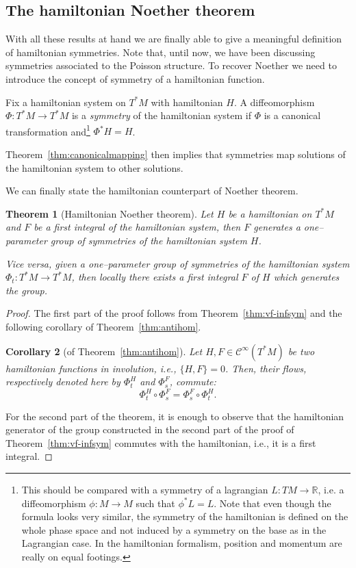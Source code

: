 \documentclass[english,fontsize=11pt,paper=a5,oneside]{scrbook}
\newcommand{\cC}{\mathcal{C}}
\newcommand{\R}{\mathbb{R}}
\newtheorem{theorem}{Theorem}[chapter]
\newtheorem{corollary}[theorem]{Corollary}
\theoremstyle{definition}
\begin{document}
\subsection{The hamiltonian Noether theorem}

With all these results at hand we are finally able to give a meaningful definition of hamiltonian symmetries.
Note that, until now, we have been discussing symmetries associated to the Poisson structure.
To recover Noether we need to introduce the concept of symmetry of a hamiltonian function.

\begin{tcolorbox}
  Fix a hamiltonian system on $T^*M$ with hamiltonian $H$. A diffeomorphism $\Phi:T^*M\to T^* M$ is a \emph{symmetry} of the hamiltonian system if $\Phi$ is a canonical transformation and\footnote{This should be compared with a symmetry of a lagrangian $L:TM \to\R$, i.e. a diffeomorphism $\phi: M \to M$ such that $\phi^* L = L$. Note that even though the formula looks very similar, the symmetry of the hamiltonian is defined on the whole phase space and not induced by a symmetry on the base as in the Lagrangian case. In the hamiltonian formalism, position and momentum are really on equal footings.} $\Phi^* H = H$.
\end{tcolorbox}

Theorem~\ref{thm:canonicalmapping} then implies that symmetries map solutions of the hamiltonian system to other solutions.

We can finally state the hamiltonian counterpart of Noether theorem.

\begin{theorem}[Hamiltonian Noether theorem]
  Let $H$ be a hamiltonian on $T^*M$ and $F$ be a first integral of the hamiltonian system, then $F$ generates a one--parameter group of symmetries of the hamiltonian system $H$.

  Vice versa, given a one--parameter group of symmetries of the hamiltonian system $\Phi_t:T^*M\to T^* M$, then \emph{locally} there exists a first integral $F$ of $H$ which generates the group.
\end{theorem}
\begin{proof}
  The first part of the proof follows from Theorem~\ref{thm:vf-infsym} and the following corollary of Theorem~\ref{thm:antihom}.

  \begin{corollary}[of Theorem~\ref{thm:antihom}]
    Let $H, F \in \cC^\infty(T^*M)$ be two hamiltonian functions in involution, i.e., $\{H,F\}=0$.
    Then, their flows, respectively denoted here by $\Phi_t^H$ and $\Phi_s^F$, commute:
    \begin{equation}
      \Phi_t^H \circ \Phi_s^F = \Phi_s^F \circ \Phi_t^H.
    \end{equation}
  \end{corollary}

  For the second part of the theorem, it is enough to observe that the hamiltonian generator of the group constructed in the second part of the proof of Theorem~\ref{thm:vf-infsym} commutes with the hamiltonian, i.e., it is a first integral.
\end{proof}
\end{document}
